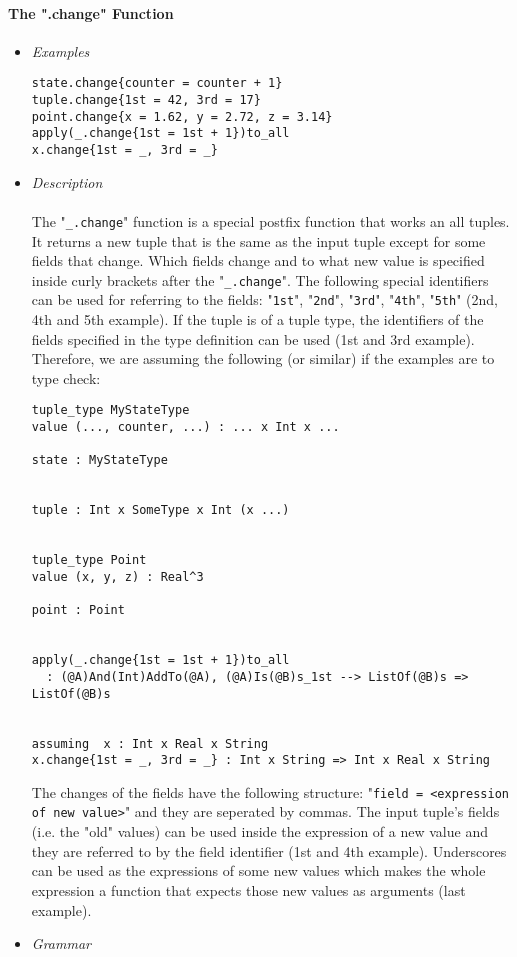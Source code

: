 \documentclass{article}
\begin{document}
\paragraph{The ".change" Function}

\begin{itemize}

\item \textit{Examples}

\begin{verbatim}
state.change{counter = counter + 1}
tuple.change{1st = 42, 3rd = 17}
point.change{x = 1.62, y = 2.72, z = 3.14}
apply(_.change{1st = 1st + 1})to_all
x.change{1st = _, 3rd = _}
\end{verbatim}

\item \textit{Description}
\\\\
The "\verb|_.change|" function is a special postfix function that works an all
tuples. It returns a new tuple that is the same as the input tuple except for
some fields that change. Which fields change and to what new value is specified
inside curly brackets after the "\verb|_.change|". The following special
identifiers can be used for referring to the fields:
"\verb|1st|", "\verb|2nd|", "\verb|3rd|", "\verb|4th|", "\verb|5th|"
(2nd, 4th and 5th example). If the tuple is of a tuple type, the identifiers of
the fields specified in the type definition can be used (1st and 3rd example).
Therefore, we are assuming the following (or similar) if the examples are to
type check:

\begin{verbatim}
tuple_type MyStateType
value (..., counter, ...) : ... x Int x ...

state : MyStateType


tuple : Int x SomeType x Int (x ...)


tuple_type Point
value (x, y, z) : Real^3

point : Point


apply(_.change{1st = 1st + 1})to_all
  : (@A)And(Int)AddTo(@A), (@A)Is(@B)s_1st --> ListOf(@B)s => ListOf(@B)s


assuming  x : Int x Real x String
x.change{1st = _, 3rd = _} : Int x String => Int x Real x String
\end{verbatim}
The changes of the fields have the following structure:
"\verb|field = <expression of new value>|"
and they are seperated by commas. The input tuple's fields (i.e. the
"old" values) can be used inside the expression of a new value and they are
referred to by the field identifier (1st and 4th example). Underscores can be
used as the expressions of some new values which makes the whole expression
a function that expects those new values as arguments (last example).
\item \textit{Grammar}


\end{itemize}
\end{document}
